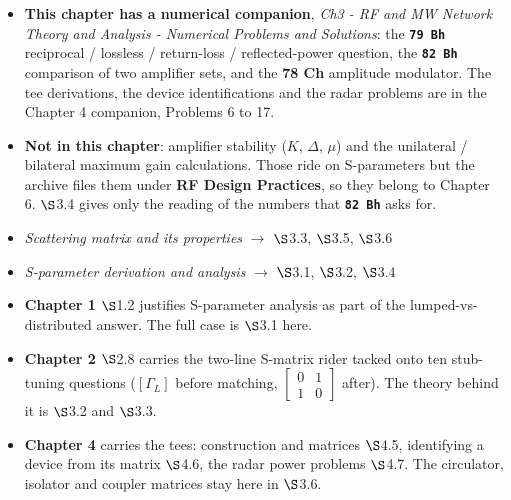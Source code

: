 \begin{itemize}
  \item \textbf{This chapter has a numerical companion}, \textit{Ch3 - RF and MW Network
    Theory and Analysis - Numerical Problems and Solutions}: the \textbf{\texttt{79 Bh}}
    reciprocal / lossless / return-loss / reflected-power question, the
    \textbf{\texttt{82 Bh}} comparison of two amplifier sets, and the \textbf{78 Ch}
    amplitude modulator. The tee derivations, the device identifications and the radar
    problems are in the Chapter 4 companion, Problems 6 to 17.
  \item \textbf{Not in this chapter}: amplifier stability ($K$, $\Delta$, $\mu$) and the
    unilateral / bilateral maximum gain calculations. Those ride on S-parameters but the
    archive files them under \textbf{RF Design Practices}, so they belong to Chapter 6.
    $\S$3.4 gives only the reading of the numbers that \textbf{\texttt{82 Bh}} asks for.
\end{itemize}

\par{}
\begin{itemize}
  \item \textit{Scattering matrix and its properties} $\rightarrow$ $\S$3.3, $\S$3.5,
    $\S$3.6 \checkmark
  \item \textit{S-parameter derivation and analysis} $\rightarrow$ $\S$3.1, $\S$3.2,
    $\S$3.4 \checkmark
\end{itemize}

\begin{itemize}
  \item \textbf{Chapter 1} $\S$1.2 justifies S-parameter analysis as part of the
    lumped-vs-distributed answer. The full case is $\S$3.1 here.
  \item \textbf{Chapter 2} $\S$2.8 carries the two-line S-matrix rider tacked onto ten
    stub-tuning questions ($[\Gamma_L]$ before matching, $\left[\begin{smallmatrix}0&1\\1&0\end{smallmatrix}\right]$
    after). The theory behind it is $\S$3.2 and $\S$3.3.
  \item \textbf{Chapter 4} carries the tees: construction and matrices $\S$4.5,
    identifying a device from its matrix $\S$4.6, the radar power problems $\S$4.7. The
    circulator, isolator and coupler matrices stay here in $\S$3.6.
\end{itemize}

\vspace{2pt}
